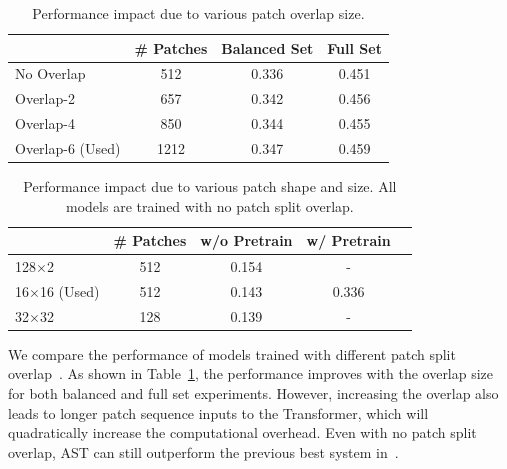 \documentclass[a4paper]{article}
\newcommand{\squeezeup}{\vspace{-2.0mm}}
\begin{document}
\begin{table}[t]
\footnotesize
\centering
\caption{Performance impact due to various patch overlap size.}
\label{tab:overlap}
\begin{tabular}{@{}lccc@{}}
\toprule
                               & \# Patches & Balanced Set & Full Set \\ \midrule
No Overlap                     &  512            &    0.336  & 0.451              \\
Overlap-2                      &  657            &    0.342  & 0.456              \\
Overlap-4                      &  850            &    0.344  & 0.455           \\
Overlap-6 (Used)               &  1212            &   0.347 &  0.459              \\\bottomrule
\end{tabular}
\end{table}

\begin{table}[!t]
\footnotesize
\centering
\caption{Performance impact due to various patch shape and size. All models are trained with no patch split overlap.}
\label{tab:patchsize}
\begin{tabular}{@{}lcccc@{}}
\toprule
                               & \# Patches   & w/o Pretrain & w/ Pretrain  \\ \midrule
128$\times$2                   &  512         & 0.154    &   -           \\
16$\times$16 (Used)            &  512         & 0.143       &  0.336            \\ 
32$\times$32                   &  128         & 0.139      &   -           \\
\bottomrule
\end{tabular}
\squeezeup
\end{table}

 We compare the performance of models trained with different patch split overlap~\cite{yuan2021tokens}. As shown in Table~\ref{tab:overlap}, the performance improves with the overlap size for both balanced and full set experiments. However, increasing the overlap also leads to longer patch sequence inputs to the Transformer, which will quadratically increase the computational overhead. Even with no patch split overlap, AST can still outperform the previous best system in~\cite{gong2021psla}.
\end{document}
